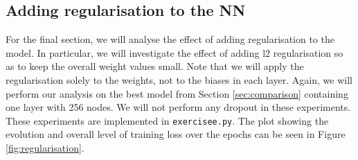 \documentclass[12pt]{article}
\newcommand{\exercisee}{\texttt{exercisee.py}\;}
\begin{document}
\subsection{Adding regularisation to the NN}

For the final section, we will analyse the effect of adding regularisation to the model. In particular, we will investigate the effect of adding l2 regularisation so as to keep the overall weight values small. Note that we will apply the regularisation solely to the weights, not to the biases in each layer. Again, we will perform our analysis on the best model from Section \ref{sec:comparison} containing one layer with 256 nodes. We will not perform any dropout in these experiments. These experiments are implemented in \exercisee. The plot showing the evolution and overall level of training loss over the epochs can be seen in Figure \ref{fig:regularisation}. 
\end{document}

